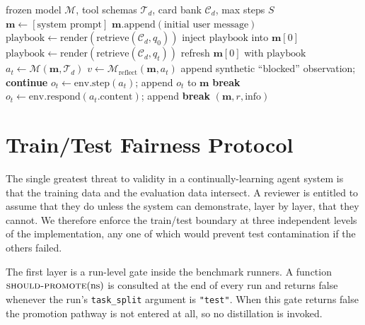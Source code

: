 \documentclass[conference]{IEEEtran}
\begin{document}
\begin{algorithm}[t]
\caption{PRAXIS inference loop for a single task.}
\label{alg:praxis}
\begin{algorithmic}[1]
\Require frozen model $\mathcal{M}$, tool schemas $\mathcal{T}_d$, card bank $\mathcal{C}_d$, max steps $S$
\State $\mathbf{m} \gets [\text{system prompt}]$
\State $\mathbf{m}.\text{append}(\text{initial user message})$
\State $\text{playbook} \gets \text{render}(\text{retrieve}(\mathcal{C}_d, q_0))$
\State inject $\text{playbook}$ into $\mathbf{m}[0]$
    \State $\text{playbook} \gets \text{render}(\text{retrieve}(\mathcal{C}_d, q_t))$
    \State refresh $\mathbf{m}[0]$ with $\text{playbook}$
  \EndIf
  \State $a_t \gets \mathcal{M}(\mathbf{m}, \mathcal{T}_d)$
      \State $v \gets \mathcal{M}_{\text{reflect}}(\mathbf{m}, a_t)$
        \State append synthetic ``blocked'' observation; \textbf{continue}
      \EndIf
    \EndIf
    \State $o_t \gets \text{env.step}(a_t)$; append $o_t$ to $\mathbf{m}$
     \textbf{break} \EndIf
  \Else
    \State $o_t \gets \text{env.respond}(a_t.\text{content})$; append
     \textbf{break} \EndIf
  \EndIf
\EndFor
\State \Return $(\mathbf{m}, r, \text{info})$
\end{algorithmic}
\end{algorithm}

\section{Train/Test Fairness Protocol}\label{sec:fairness}

The single greatest threat to validity in a continually-learning
agent system is that the training data and the evaluation data
intersect. A reviewer is entitled to assume that they do unless
the system can demonstrate, layer by layer, that they cannot. We
therefore enforce the train/test boundary at three independent
levels of the implementation, any one of which would prevent test
contamination if the others failed.

The first layer is a run-level gate inside the benchmark runners.
A function $\textsc{should-promote}(\text{ns})$ is consulted at
the end of every run and returns \textsf{false} whenever the run's
\texttt{task\_split} argument is \texttt{"test"}. When this gate
returns false the promotion pathway is not entered at all, so no
distillation is invoked.
\end{document}
